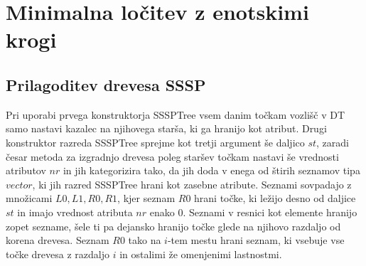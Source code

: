\documentclass[a4paper, 12pt]{book}
\begin{document}
\section{Minimalna ločitev z enotskimi krogi}
\subsection{Prilagoditev drevesa SSSP}
Pri uporabi prvega konstruktorja SSSPTree vsem danim točkam vozlišč v DT samo nastavi kazalec na njihovega starša, ki ga hranijo kot atribut. Drugi konstruktor razreda SSSPTree sprejme kot tretji argument še daljico $st$, zaradi česar metoda za izgradnjo drevesa poleg staršev točkam nastavi še vrednosti atributov $nr$ in jih kategorizira tako, da jih doda v enega od štirih seznamov tipa $vector$, ki jih razred SSSPTree hrani kot zasebne atribute. Seznami sovpadajo z množicami $L0, L1, R0, R1$, kjer seznam $R0$ hrani točke, ki ležijo desno od daljice $st$ in imajo vrednost atributa $nr$ enako $0$. Seznami v resnici kot elemente hranijo zopet sezname, šele ti pa dejansko hranijo točke glede na njihovo razdaljo od korena drevesa. Seznam $R0$ tako na $i$-tem mestu  hrani seznam, ki vsebuje vse točke drevesa z razdaljo $i$ in ostalimi že omenjenimi lastnostmi.
\end{document}
